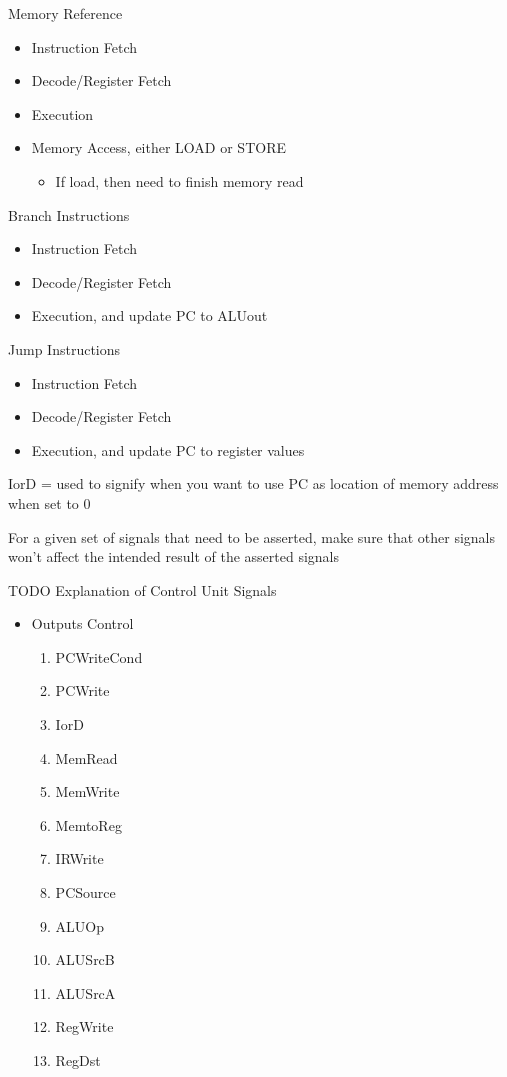 \documentclass{article}
\begin{document}
		Memory Reference
		\begin{itemize}
			\item Instruction Fetch
			\item Decode/Register Fetch
			\item Execution
			\item Memory Access, either LOAD or STORE
			\begin{itemize}
				\item If load, then need to finish memory read
			\end{itemize}
		\end{itemize}

		Branch Instructions
		\begin{itemize}
			\item Instruction Fetch
			\item Decode/Register Fetch
			\item Execution, and update PC to ALUout
		\end{itemize}

		Jump Instructions
		\begin{itemize}
			\item Instruction Fetch
			\item Decode/Register Fetch
			\item Execution, and update PC to register values
		\end{itemize}

		IorD = used to signify when you want to use PC as location of memory address when set to 0

		For a given set of signals that need to be asserted, make sure that other signals won't affect the intended result of the asserted signals

		TODO
		Explanation of Control Unit Signals
		\begin{itemize}
			\item Outputs Control
			\begin{enumerate}
				\item PCWriteCond
				\item PCWrite
				\item IorD
				\item MemRead
				\item MemWrite
				\item MemtoReg
				\item IRWrite
				\item PCSource
				\item ALUOp
				\item ALUSrcB
				\item ALUSrcA
				\item RegWrite
				\item RegDst
			\end{enumerate}
		\end{itemize}
		
\end{document}
